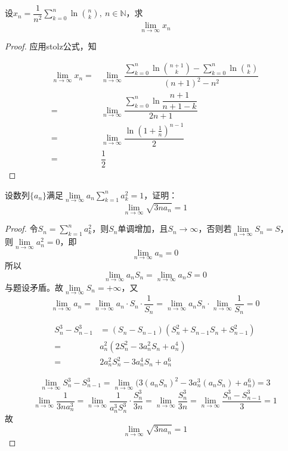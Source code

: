\begin{proposition}
    
    设$x_n = \dfrac{1}{n^2} \sum\limits_{k=0}^{n}{\ln{\binom{n}{k}}},\ n\in\mathbb{N}$，求
    $$\lim\limits_{n\to\infty}{x_n}$$

\end{proposition}

\begin{proof}
    
    应用\textup{stolz}公式，知

    \begin{align*}
        \lim_{n\to\infty}{x_n}  = & \lim_{n\to\infty}{\dfrac{\sum\limits_{k=0}^{n}{\ln{\binom{n+1}{k}}} - \sum\limits_{k=0}^{n}{\ln{\binom{n}{k}}}}{(n+1)^2 - n^2}} \\
        = & \lim_{n\to\infty}{\dfrac{\sum\limits_{k=0}^{n}{\ln{\dfrac{n+1}{n+1-k}}}}{2n+1}} \\
        = & \lim_{n\to\infty}{\dfrac{\ln{(1+\frac{1}{n})^{n-1}}}{2}} \\
        = & \dfrac{1}{2}
    \end{align*}

\end{proof}

\begin{proposition}
    
    设数列$\{a_n\}$满足$\lim\limits_{n\to\infty}{a_n\sum\limits_{k=1}^{n}{a_k^2}} = 1$，证明：
    $$\lim_{n\to\infty}{\sqrt{3na_n}} = 1$$

\end{proposition}

\begin{proof}

    令$S_n = \sum\limits_{k=1}^{n}{a_k^2}$，则$S_n$单调增加，且$S_n\to\infty$，否则若$\lim\limits_{n\to\infty}{S_n} = S$，\\
    则$\lim\limits_{n\to\infty}{a_n^2} = 0$，即
    $$\lim\limits_{n\to\infty}{a_n} = 0$$
    所以
    $$\lim\limits_{n\to\infty}{a_nS_n} = \lim\limits_{n\to\infty}{a_nS} = 0$$
    与题设矛盾。故$\lim\limits_{n\to\infty}{S_n} = +\infty$，又
    $$\lim_{n\to\infty}{a_n} = \lim_{n\to\infty}{a_n \cdot S_n \cdot \dfrac{1}{S_n}} = \lim_{n\to\infty}{a_nS_n} \cdot \lim_{n\to\infty}{\dfrac{1}{S_n}} = 0$$

    \begin{align*}
        S_n^3 - S_{n-1}^3 &= (S_n - S_{n-1}) (S_n^2 + S_{n-1}S_n + S_{n-1}^2) \\
        = & a_n^2 (2S_n^2 - 3a_n^2S_n + a_n^4) \\
        = & 2a_n^2S_n^2 - 3a_n^4S_n + a_n^6 
    \end{align*}
    
    $$\lim_{n\to\infty}{S_n^3 - S_{n-1}^3}= \lim_{n\to\infty}{\big( 3(a_nS_n)^2 - 3a_n^3(a_nS_n) + a_n^6 \big)} = 3$$
    $$\lim_{n\to\infty}{\dfrac{1}{3na_n^3}} = \lim_{n\to\infty}{\dfrac{1}{a_n^3S_n^3} \cdot \dfrac{S_n^3}{3n}} = \lim_{n\to\infty}{\dfrac{S_n^3}{3n}} = \lim_{n\to\infty}{\dfrac{S_n^3 - S_{n-1}^3}{3}} = 1$$
    故
    $$\lim_{n\to\infty}{\sqrt{3na_n}} = 1$$

\end{proof}

